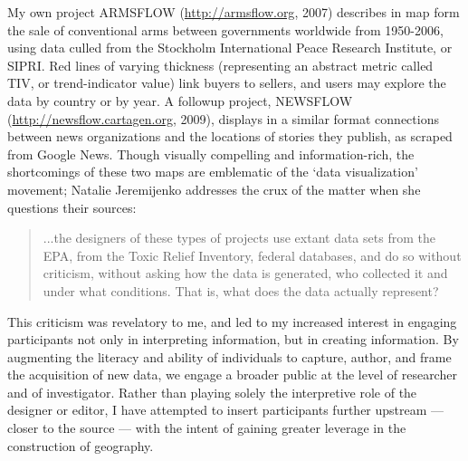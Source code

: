 \documentclass[11pt]{report}
\begin{document}



My own project ARMSFLOW (\url{http://armsflow.org}, 2007) describes in map form the sale of conventional arms between governments worldwide from 1950-2006, using data culled from the Stockholm International Peace Research Institute, or SIPRI. Red lines of varying thickness (representing an abstract metric called TIV, or trend-indicator value) link buyers to sellers, and users may explore the data by country or by year. A followup project, NEWSFLOW (\url{http://newsflow.cartagen.org}, 2009), displays in a similar format connections between news organizations and the locations of stories they publish, as scraped from Google News. Though visually compelling and information-rich, the shortcomings of these two maps are emblematic of the `data visualization' movement; Natalie Jeremijenko addresses the crux of the matter when she questions their sources: 

\begin{quote}
...the designers of these types of projects use extant data sets from the EPA, from the Toxic Relief Inventory, federal databases, and do so without criticism, without asking how the data is generated, who collected it and under what conditions. That is, what does the data actually represent? \cite{jeremijenko2008situated}
\end{quote}

This criticism was revelatory to me, and led to my increased interest in engaging participants not only in interpreting information, but in creating information. By augmenting the literacy and ability of individuals to capture, author, and frame the acquisition of new data, we engage a broader public at the level of researcher and of investigator. Rather than playing solely the interpretive role of the designer or editor, I have attempted to insert participants further upstream --- closer to the source --- with the intent of gaining greater leverage in the construction of geography. 
\end{document}
